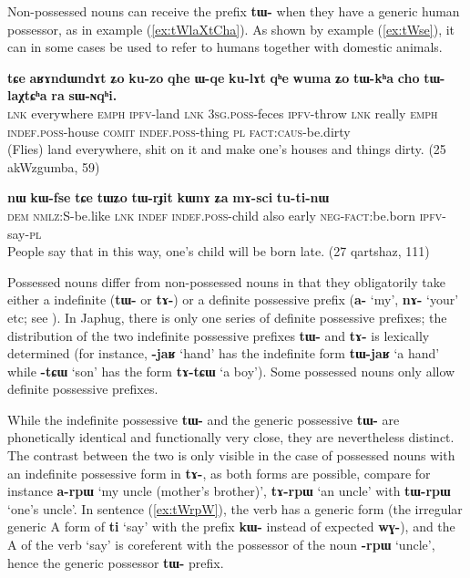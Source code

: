 \documentclass[oneside,a4paper,11pt]{article}
\newcommand{\ipa}[1]{\textbf{\phon\mbox{#1}}} %
\newcommand{\refb}[1]{(\ref{#1})}
\begin{document}
Non-possessed nouns can receive the prefix \ipa{tɯ-} when they have a generic human possessor, as in example \refb{ex:tWlaXtCha}. As shown by example \refb{ex:tWse}, it can in some cases be used to refer to humans together with domestic animals.

\begin{exe}
\ex \label{ex:tWlaXtCha}
\gll 
\ipa{tɕe}  	\ipa{aʁɤndɯndɤt}  	\ipa{ʑo}  	\ipa{ku-zo}  	\ipa{qhe}  	\ipa{ɯ-qe}  	\ipa{ku-lɤt}  	\ipa{qʰe}	\ipa{wuma}  	\ipa{ʑo}  	\ipa{tɯ-kʰa}  	\ipa{cho}  	\ipa{tɯ-laχtɕʰa}  	\ipa{ra}  	\ipa{sɯ-ɴqʰi.}  \\
\textsc{lnk} everywhere \textsc{emph} \textsc{ipfv}-land \textsc{lnk} \textsc{3sg.poss}-feces \textsc{ipfv}-throw \textsc{lnk} really \textsc{emph} \textsc{indef.poss}-house \textsc{comit} \textsc{indef.poss}-thing \textsc{pl} \textsc{fact:caus}-be.dirty \\
\glt (Flies) land everywhere, shit on it and make one's houses and things dirty. (25 akWzgumba, 59)
\end{exe}

\begin{exe}
\ex
\gll
\ipa{nɯ} 	\ipa{kɯ-fse} 	\ipa{tɕe} 	\ipa{tɯʑo} 	\ipa{tɯ-rɟit} 	\ipa{kɯnɤ} 	\ipa{ʑa} 	\ipa{mɤ-sci} 	\ipa{tu-ti-nɯ} \\
\textsc{dem} \textsc{nmlz}:S-be.like \textsc{lnk} \textsc{indef} \textsc{indef.poss}-child also early \textsc{neg-fact}:be.born \textsc{ipfv}-say-\textsc{pl} \\
\glt People say that in this way, one's child will be born late. (27 qartshaz, 111)
\end{exe}

Possessed nouns differ from non-possessed nouns in that they obligatorily take either a indefinite  (\ipa{tɯ-} or \ipa{tɤ-})  or a definite possessive prefix (\ipa{a-} `my', \ipa{nɤ-} `your' etc; see \citealt{jacques14antipassive}). In Japhug, there is only one series of definite possessive prefixes; the distribution of the two indefinite possessive prefixes \ipa{tɯ-} and \ipa{tɤ-} is lexically determined (for instance, \ipa{-jaʁ} `hand' has the indefinite form \ipa{tɯ-jaʁ} `a hand' while \ipa{-tɕɯ} `son' has the form \ipa{tɤ-tɕɯ} `a boy'). Some possessed nouns only allow definite possessive prefixes.

While the indefinite possessive \ipa{tɯ-} and the generic possessive \ipa{tɯ-} are phonetically identical and functionally very close, they are nevertheless distinct. The contrast between the two is only visible in the case of possessed nouns with an indefinite possessive form in \ipa{tɤ-}, as both forms are possible, compare for instance \ipa{a-rpɯ} `my uncle (mother's brother)', \ipa{tɤ-rpɯ} `an uncle' with \ipa{tɯ-rpɯ} `one's uncle'. In sentence \refb{ex:tWrpW}, the verb has a generic form (the irregular generic A form of \ipa{ti} `say' with the prefix \ipa{kɯ-} instead of expected \ipa{wɣ-}), and the A of the verb `say' is coreferent with the possessor of the noun   \ipa{-rpɯ}  `uncle', hence the generic possessor \ipa{tɯ-} prefix.
\end{document}
